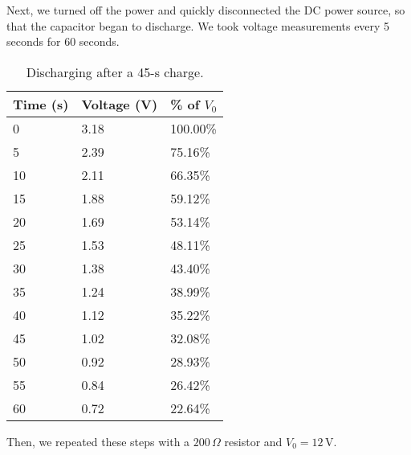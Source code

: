 \documentclass[11pt, titlepage, letterpaper, twoside]{article}
\begin{document}
\pagebreak



Next, we turned off the power and quickly disconnected the DC power source, so that the
capacitor began to discharge. We took voltage measurements every 5 seconds for 60 seconds.

\begin{table}[h!]
\centering
\caption{Discharging after a 45-s charge.}
\label{discharging-1}
\begin{tabular}{|l|l|l|}
\hline
Time (s) & Voltage (V) & \% of $V_0$ \\ \hline
0        & 3.18        & 100.00\%   \\ \hline
5        & 2.39        & 75.16\%    \\ \hline
10       & 2.11        & 66.35\%    \\ \hline
15       & 1.88        & 59.12\%    \\ \hline
20       & 1.69        & 53.14\%    \\ \hline
25       & 1.53        & 48.11\%    \\ \hline
30       & 1.38        & 43.40\%    \\ \hline
35       & 1.24        & 38.99\%    \\ \hline
40       & 1.12        & 35.22\%    \\ \hline
45       & 1.02        & 32.08\%    \\ \hline
50       & 0.92        & 28.93\%    \\ \hline
55       & 0.84        & 26.42\%    \\ \hline
60       & 0.72        & 22.64\%    \\ \hline
\end{tabular}
\end{table}



Then, we repeated these steps with a $200\,\Omega$ resistor and $V_0 = 12\,\mathrm{V}$.
\end{document}
